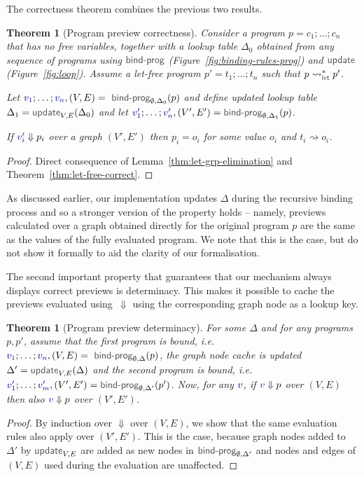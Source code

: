\documentclass[acmsmall,anonymous,fleqn]{acmart}\settopmatter{printfolios=false,printccs=false,printacmref=false}
\newcounter{thc}
\theoremstyle{plain}
\newtheorem{theorem}[thc]{Theorem}
\theoremstyle{definition}
\newcommand{\ident}[1]{\textnormal{\textcolor{idclr}{\sffamily #1}}}
\newcommand{\bndclr}[1]{\textcolor{kvdclr}{#1}}
\begin{document}
\noindent
The correctness theorem combines the previous two results.

\begin{theorem}[Program preview correctness]
\label{thm:correcntess}
Consider a program $p=c_1;\ldots;c_n$ that has no free variables, together with a lookup table
$\Delta_0$ obtained from any sequence of programs using $\ident{bind-prog}$
(Figure~\ref{fig:binding-rules-prog}) and $\ident{update}$ (Figure~\ref{fig:loop}). Assume a
let-free program $p'=t_1;\ldots;t_n$ such that $p\rightsquigarrow^{*}_\ident{let}p'$.

\vspace{0.25em}
\noindent
Let $\bndclr{v_1};\ldots;\bndclr{v_n}, (V, E) = \ident{bind-prog}_{\emptyset, \Delta_0}(p)$
and define updated lookup table $\Delta_1=\ident{update}_{V, E}(\Delta_0)$ and
let $\bndclr{v'_1};\ldots;\bndclr{v'_n}, (V', E') = \ident{bind-prog}_{\emptyset, \Delta_1}(p)$.

\vspace{0.25em}
\noindent
If $\bndclr{v'_i}\Downarrow p_i$ over a graph $(V', E')$ then $p_i=o_i$ for some value $o_i$ and
$t_i \rightsquigarrow o_i$.
\end{theorem}
\begin{proof}
Direct consequence of Lemma~\ref{thm:let-grp-elimination} and Theorem~\ref{thm:let-free-correct}.
\end{proof}

As discussed earlier, our implementation updates $\Delta$ during the recursive binding process and
so a stronger version of the property holds -- namely, previews calculated over a graph obtained
directly for the original program $p$ are the same as the values of the fully evaluated program.
We note that this is the case, but do not show it formally to aid the clarity of our formalisation.

The second important property that guarantees that our mechanism always displays correct previews
is determinacy. This makes it possible to cache the previews evaluated using~$\Downarrow$ using
the corresponding graph node as a lookup key.

\begin{theorem}[Program preview determinacy]
\label{thm:determinacy}
For some $\Delta$ and for any programs $p, p'$, assume that the first program is bound,
i.e.~$\bndclr{v_1};\ldots;\bndclr{v_n}, (V, E) = \ident{bind-prog}_{\emptyset, \Delta}(p)$,
the graph node cache is updated $\Delta' = \ident{update}_{V, E}(\Delta)$ and the second program is
bound, i.e.~$\bndclr{v'_1};\ldots;\bndclr{v'_m}, (V', E') = \ident{bind-prog}_{\emptyset, \Delta'}(p')$.
Now, for any $\bndclr{v}$, if $\bndclr{v} \Downarrow p$ over $(V, E)$ then also
 $\bndclr{v} \Downarrow p$ over $(V', E')$.
\end{theorem}
\begin{proof}
By induction over $\Downarrow$ over $(V, E)$, we show that the same evaluation rules also
apply over $(V', E')$. This is the case, because graph nodes added to $\Delta'$ by $\ident{update}_{V, E}$
are added as new nodes in $\ident{bind-prog}_{\emptyset, \Delta'}$ and
nodes and edges of $(V, E)$ used during the evaluation are unaffected.
\end{proof}
\end{document}
